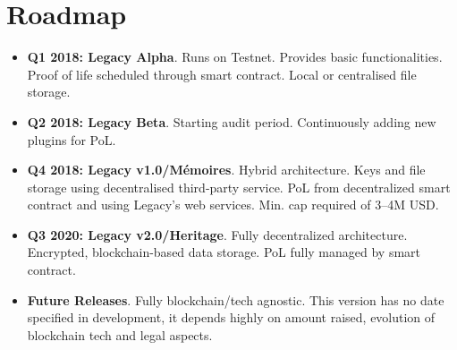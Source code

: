 \chapter{Roadmap} %
\label{cha:roadmap}

\begin{itemize}
	\item \textbf{Q1 2018: Legacy Alpha}. Runs on Testnet. Provides basic functionalities. Proof of life scheduled through smart contract. Local or centralised file storage.
	\item \textbf{Q2 2018: Legacy Beta}. Starting audit period. Continuously adding new plugins for PoL.
	\item \textbf{Q4 2018: Legacy v1.0/Mémoires}. Hybrid architecture. Keys and file storage using decentralised third-party service. PoL from decentralized smart contract and using Legacy's web services. Min. cap required of 3–4M USD.
	\item \textbf{Q3 2020: Legacy v2.0/Heritage}. Fully decentralized architecture. Encrypted, blockchain-based data storage. PoL fully managed by smart contract.
	\item \textbf{Future Releases}. Fully blockchain/tech agnostic. This version has no date specified in development, it depends highly on amount raised, evolution of blockchain tech and legal aspects.
\end{itemize}


